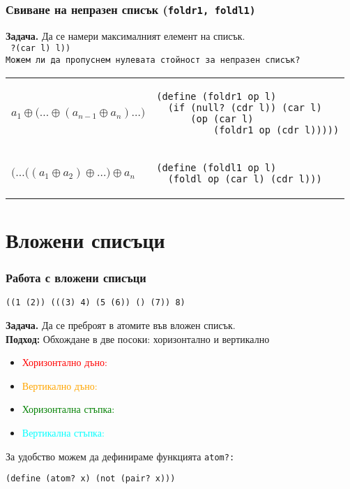 \documentclass{beamer}
\begin{document}
\begin{frame}[fragile]
  \frametitle{Свиване на непразен списък (\tt{foldr1, foldl1})}

  \textbf{Задача.} Да се намери максималният елемент на списък.\\
  \pause
  \tt{ ?{(car l)} l))}\\[1em]
  \pause\pause
  Можем ли да пропуснем нулевата стойност за непразен списък?\\[1em]
  \begin{tabular}{ll}
    \pause
      $a_1 \oplus \big(\ldots \oplus (a_{n-1} \oplus a_n) \ldots\big)$
    & \pause
\begin{lstlisting}
(define (foldr1 op l)
  (if (null? (cdr l)) (car l)
      (op (car l)
          (foldr1 op (cdr l)))))
\end{lstlisting}\\[3em]
    \pause
    $\big(\ldots\big((a_1 \oplus a_2) \oplus \ldots\big) \oplus a_n$
    & \pause
\begin{lstlisting}
(define (foldl1 op l)
  (foldl op (car l) (cdr l)))
\end{lstlisting}
  \end{tabular}
\end{frame}

\section{Вложени списъци}

\newcommand{\hzero}{\textcolor{red}}
\newcommand{\vzero}{\textcolor{orange}}
\newcommand{\hstep}{\textcolor{green}}
\newcommand{\vstep}{\textcolor{cyan}}

\begin{frame}[fragile]
  \frametitle{Работа с вложени списъци}

\begin{verbatim}
((1 (2)) (((3) 4) (5 (6)) () (7)) 8)
\end{verbatim}
  \textbf{Задача.} Да се преброят в атомите във вложен списък.\\
  \textbf{Подход:} Обхождане в две посоки: хоризонтално и вертикално
  \pause
  \begin{itemize}[<+->]
  \item \hzero{Хоризонтално дъно:} 
  \item \vzero{Вертикално дъно:} 
  \item \hstep{Хоризонтална стъпка:} 
  \item \vstep{Вертикална стъпка:} 
  \end{itemize}
  \vspace{1em}
  \onslide<+->
  За удобство можем да дефинираме функцията \tt{atom?}:
\begin{lstlisting}
(define (atom? x) (not (pair? x)))
\end{lstlisting}
\end{frame}
\end{document}
